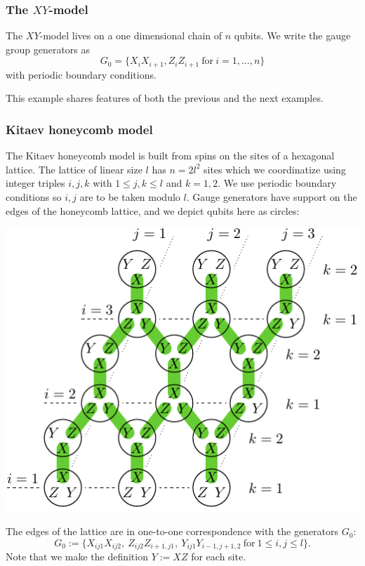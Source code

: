 \documentclass[12pt]{article}
\begin{document}

%

\subsubsection{The $XY$-model}

The $XY$-model lives on a one dimensional chain of $n$ qubits.
We write the gauge group generators as
$$
    G_0 = \{ X_i X_{i+1}, Z_i Z_{i+1} \ \mbox{for}\ i=1,...,n \}
$$
with periodic boundary conditions.

This example shares features of both the previous and the next examples.



%

\subsubsection{Kitaev honeycomb model}




The Kitaev honeycomb model \cite{Kitaev2006} is built from spins on
the sites of a hexagonal lattice. 
The lattice of linear size $l$ has $n=2l^2$ sites
which we coordinatize using integer triples $i, j, k$
with $1\le j, k\le l$ and $k=1, 2.$
We use periodic boundary conditions so $i, j$ are
to be taken modulo $l$.
Gauge generators have support on the edges of the honeycomb lattice,
and we depict qubits here as circles:
\begin{center}
\includegraphics[width=0.6\columnwidth]{fig_00.pdf}
\end{center}
The edges of the lattice are in one-to-one
correspondence with the generators $G_0$:
$$
G_0 := \big\{X_{ij1}X_{ij2},\ Z_{ij2}Z_{i+1,j1},\ Y_{ij1}Y_{i-1,j+1,2}
\ \mbox{for}\ 1\le i,j\le l\big\}.
$$
Note that we make the definition $Y:=XZ$ for each site.
\end{document}

